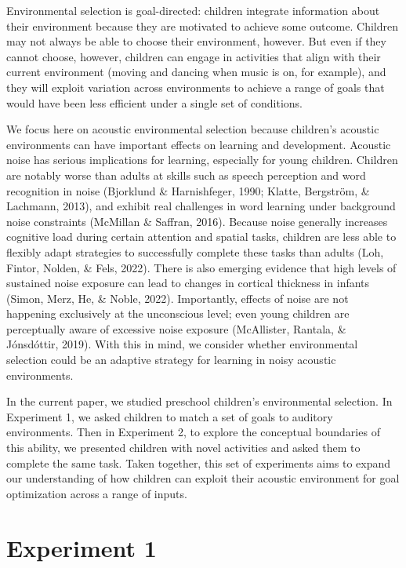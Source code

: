 \documentclass[10pt, letterpaper]{article}
\begin{document}
Environmental selection is goal-directed: children integrate information
about their environment because they are motivated to achieve some
outcome. Children may not always be able to choose their environment,
however. But even if they cannot choose, however, children can engage in
activities that align with their current environment (moving and dancing
when music is on, for example), and they will exploit variation across
environments to achieve a range of goals that would have been less
efficient under a single set of conditions.

We focus here on acoustic environmental selection because children's
acoustic environments can have important effects on learning and
development. Acoustic noise has serious implications for learning,
especially for young children. Children are notably worse than adults at
skills such as speech perception and word recognition in noise
(Bjorklund \& Harnishfeger, 1990; Klatte, Bergström, \& Lachmann, 2013),
and exhibit real challenges in word learning under background noise
constraints (McMillan \& Saffran, 2016). Because noise generally
increases cognitive load during certain attention and spatial tasks,
children are less able to flexibly adapt strategies to successfully
complete these tasks than adults (Loh, Fintor, Nolden, \& Fels, 2022).
There is also emerging evidence that high levels of sustained noise
exposure can lead to changes in cortical thickness in infants (Simon,
Merz, He, \& Noble, 2022). Importantly, effects of noise are not
happening exclusively at the unconscious level; even young children are
perceptually aware of excessive noise exposure (McAllister, Rantala, \&
Jónsdóttir, 2019). With this in mind, we consider whether environmental
selection could be an adaptive strategy for learning in noisy acoustic
environments.

In the current paper, we studied preschool children's environmental
selection. In Experiment 1, we asked children to match a set of goals to
auditory environments. Then in Experiment 2, to explore the conceptual
boundaries of this ability, we presented children with novel activities
and asked them to complete the same task. Taken together, this set of
experiments aims to expand our understanding of how children can exploit
their acoustic environment for goal optimization across a range of
inputs.

\hypertarget{experiment-1}{%
\section{Experiment 1}\label{experiment-1}}
\end{document}
